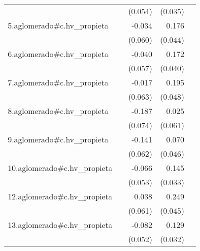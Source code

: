 {\begin{longtable}{l*{4}{D{.}{.}{-1}}}
            &                     &     (0.054)         &     (0.035)         &                     \\
\addlinespace
5.aglomerado#c.hv\_propieta&                     &      -0.034         &       0.176\sym{***}&                     \\
            &                     &     (0.060)         &     (0.044)         &                     \\
\addlinespace
6.aglomerado#c.hv\_propieta&                     &      -0.040         &       0.172\sym{***}&                     \\
            &                     &     (0.057)         &     (0.040)         &                     \\
\addlinespace
7.aglomerado#c.hv\_propieta&                     &      -0.017         &       0.195\sym{***}&                     \\
            &                     &     (0.063)         &     (0.048)         &                     \\
\addlinespace
8.aglomerado#c.hv\_propieta&                     &      -0.187\sym{*}  &       0.025         &                     \\
            &                     &     (0.074)         &     (0.061)         &                     \\
\addlinespace
9.aglomerado#c.hv\_propieta&                     &      -0.141\sym{*}  &       0.070         &                     \\
            &                     &     (0.062)         &     (0.046)         &                     \\
\addlinespace
10.aglomerado#c.hv\_propieta&                     &      -0.066         &       0.145\sym{***}&                     \\
            &                     &     (0.053)         &     (0.033)         &                     \\
\addlinespace
12.aglomerado#c.hv\_propieta&                     &       0.038         &       0.249\sym{***}&                     \\
            &                     &     (0.061)         &     (0.045)         &                     \\
\addlinespace
13.aglomerado#c.hv\_propieta&                     &      -0.082         &       0.129\sym{***}&                     \\
            &                     &     (0.052)         &     (0.032)         &                     \\

\end{longtable}}
